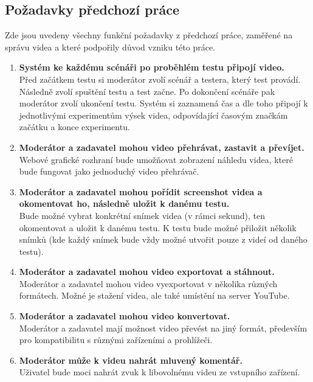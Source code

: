 \documentclass[thesis=M,czech]{FITthesis}[2012/06/26]
\begin{document}
\subsection{Požadavky předchozí práce} \label{subsec:analyza_predchozi_prace_pozadavky}
Zde jsou uvedeny všechny funkční požadavky z předchozí práce, zaměřené na správu videa a které podpořily důvod vzniku této práce.
\begin{enumerate}
	\item \textbf{Systém ke každému scénáři po proběhlém testu připojí video.\\}
Před začátkem testu si moderátor zvolí scénář a testera, který test provádí. Následně zvolí spuštění testu a test začne. Po dokončení scénáře pak moderátor zvolí ukončení testu. Systém si zaznamená čas a dle toho připojí k jednotlivými experimentům výsek videa, odpovídající časovým značkám začátku a konce experimentu.

	\item \textbf{Moderátor a zadavatel mohou video přehrávat, zastavit a převíjet.\\}
Webové grafické rozhraní bude umožňovat zobrazení náhledu videa, které bude fungovat jako jednoduchý video přehrávač.

	\item \textbf{Moderátor a zadavatel mohou pořídit screenshot videa a okomentovat ho, následně uložit k danému testu.\\}
Bude možné vybrat konkrétní snímek videa (v rámci sekund), ten okomentovat a uložit k danému testu. K testu bude možné přiložit několik snímků (kde každý snímek bude vždy možné utvořit pouze z videí od daného testu).

	\item \textbf{Moderátor a zadavatel mohou video exportovat a stáhnout.\\}
Moderátor a zadavatel mohou video vyexportovat v několika různých formátech. Možné je stažení videa, ale také umístění na server YouTube.

	\item \textbf{Moderátor a zadavatel mohou video konvertovat.\\}
Moderátor a zadavatel mají možnost video převést na jiný formát, především pro kompatibilitu s různými zařízeními a prohlížeči.

	\item \textbf{Moderátor může k videu nahrát mluvený komentář.\\}
Uživatel bude moci nahrát zvuk k libovolnému videu ze vstupního zařízení.
\end{enumerate}
\end{document}
